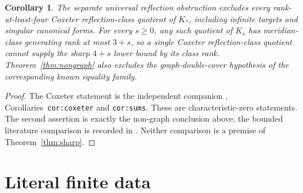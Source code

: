 \documentclass[11pt]{article}
\newtheorem{corollary}[theorem]{Corollary}
\begin{document}
\begin{corollary}\label{cor:comparison}
The separate universal reflection obstruction excludes every
rank-at-least-four Coxeter reflection-class quotient of $K_*$,
including infinite targets and singular canonical forms. For every $s\ge0$,
any such quotient of $K_s$ has meridian-class generating rank at most
$3+s$, so a single Coxeter reflection-class quotient cannot supply
the sharp $4+s$ lower bound by its class rank. Theorem~\ref{thm:nongraph}
also excludes the graph-double-cover hypothesis of
the corresponding known equality family.
\end{corollary}
\begin{proof}
The Coxeter statement is the independent companion
,
Corollaries~\texttt{cor:coxeter} and \texttt{cor:sums}. These are
characteristic-zero statements.
The second assertion is exactly the non-graph conclusion above;
the bounded literature comparison is recorded in
.
Neither comparison is a premise of Theorem~\ref{thm:sharp}.
\end{proof}

\section{Literal finite data}\label{sec:literal}
\end{document}
